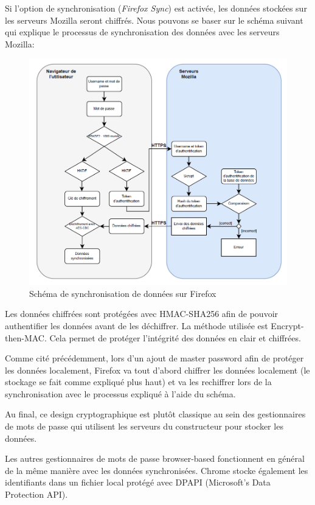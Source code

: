 Si l'option de synchronisation (\textit{Firefox Sync}) est activée\cite{firefoxsync}, les données stockées sur les serveurs Mozilla seront chiffrés. Nous pouvons se baser sur le schéma suivant qui explique le processus de synchronisation des données avec les serveurs Mozilla:
\begin{figure}[H]
	\includegraphics[width=15.5cm]{images/firefox_sync.png}
		\centering
	\caption{Schéma de synchronisation de données sur Firefox}
\end{figure}

Les données chiffrées sont protégées avec HMAC-SHA256 afin de pouvoir authentifier les données avant de les déchiffrer. La méthode utilisée est Encrypt-then-MAC. Cela permet de protéger l'intégrité des données en clair et chiffrées.

Comme cité précédemment, lors d'un ajout de master password afin de protéger les données localement, Firefox va tout d'abord chiffrer les données localement (le stockage se fait comme expliqué plus haut) et va les rechiffrer lors de la synchronisation avec le processus expliqué à l'aide du schéma.

Au final, ce design cryptographique est plutôt classique au sein des gestionnaires de mots de passe qui utilisent les serveurs du constructeur pour stocker les données.

Les autres gestionnaires de mots de passe browser-based fonctionnent en général de la même manière avec les données synchronisées. Chrome stocke également les identifiants dans un fichier local protégé avec DPAPI (Microsoft's Data Protection API).
